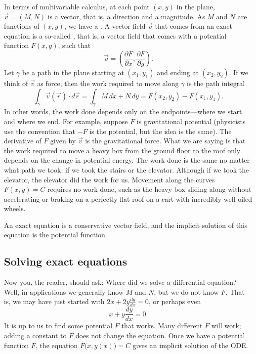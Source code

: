 In terms of multivariable calculus, at each point $(x,y)$ in the plane,
$\vec{v} = (M,N)$ is
a vector, that is, a direction and a magnitude.
As $M$ and $N$ are functions of $(x,y)$, we have a \emph{}.
A vector field $\vec{v}$ that comes from an exact equation is a so-called
\emph{}, that is, a vector field that comes with a
potential function $F(x,y)$, such that
\begin{equation*}
\vec{v} = \left( \frac{\partial F}{\partial x} ,\frac{\partial F}{\partial
y} \right) .
\end{equation*}
Let
$\gamma$ be a path in the plane starting at $(x_1,y_1)$ and ending at
$(x_2,y_2)$.
If we think of $\vec{v}$ as force, then the work required to
move along $\gamma$ is the path integral
\begin{equation*}
\int_\gamma \vec{v}(\vec{r}) \cdot d\vec{r}
=
\int_\gamma M \, dx + N \, dy
=
F(x_2,y_2) - F(x_1,y_1) .
\end{equation*}
In other words, the work done depends only on
the endpoints---where we start and where we end.
For example, suppose $F$ is gravitational potential
(physicists use the convention that $-F$ is the potential,
but the idea is the same).
The derivative of $F$ given by $\vec{v}$ is the gravitational force.
What we
are saying is that the work required to move a heavy box from the ground
floor to the roof only depends on the change in potential energy.
The work done is the same
no matter what path we took; if we took the stairs or the elevator.
Although if we took the elevator, the elevator did the work for us.
Movement along the curves $F(x,y) = C$ requires no work done, such as
the heavy box sliding along without accelerating or braking on a perfectly
flat roof on a cart with incredibly well-oiled wheels.

An exact equation is a conservative vector field, and the implicit
solution of this equation is the potential function.

\subsection{Solving exact equations}

Now you, the reader, should ask: Where did we solve a differential equation?
Well, in applications we generally know $M$ and $N$, but we do not
know $F$.  That is, we may have just started with
$2x + 2y \frac{dy}{dx} = 0$, or perhaps even
\begin{equation*}
x + y \frac{dy}{dx} = 0 .
\end{equation*}
It is up to us to find some potential $F$ that works.  Many different $F$
will work; adding a constant to $F$ does not change the equation.
Once we have a potential function $F$, the equation
$F\bigl(x,y(x)\bigr) = C$
gives an implicit solution of the ODE\@.

